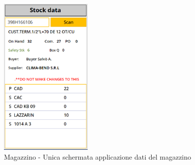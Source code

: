 \begin{figure}[H]
    \centering\includegraphics[width=0.4\textwidth, height=0.4\textheight,keepaspectratio]{immagini/M-applicazione.png}
    \caption{Magazzino - Unica schermata applicazione dati del magazzino}
    \label{fig:M-Applicazione}
\end{figure}